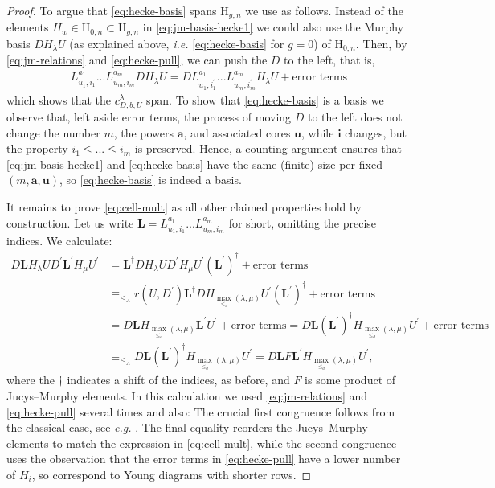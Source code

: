\documentclass[a4paper,11pt]{amsart}
\newcommand{\ie}{\textsl{i.e.}}
\newcommand{\eg}{\textsl{e.g.}}
\renewcommand{\dots}{\text{...}}
\newcommand{\setstuff}[1]{\mathrm{#1}}
\newcommand{\bsym}[1]{\boldsymbol{#1}}
\newcommand{\jm}{L}
\numberwithin{equation}{section}
\begin{document}
\begin{proof}
To argue that \eqref{eq:hecke-basis} spans
$\setstuff{H}_{g,n}$ we use \cite[Proposition 3.16]{Ma-hecke-schur} as follows.
Instead of the elements $H_{w}\in\setstuff{H}_{0,n}\subset
\setstuff{H}_{g,n}$ in \eqref{eq:jm-basis-hecke1} we could 
also use the Murphy basis $DH_{\lambda}U$ (as explained above, {\ie} 
\eqref{eq:hecke-basis} for $g=0$) of $\setstuff{H}_{0,n}$. Then, by 
\eqref{eq:jm-relations} and \eqref{eq:hecke-pull}, we can push 
the $D$ to the left, that is, 
\begin{gather*}
\jm_{u_{1}^{},i_{1}}^{a_{1}}\dots 
\jm_{u_{m},i_{m}}^{a_{m}}DH_{\lambda}U
=D\jm_{u_{1},i_{1}^{\prime}}^{a_{1}}\dots 
\jm_{u_{m},i_{m}^{\prime}}^{a_{m}}H_{\lambda}U+\text{error terms}
\end{gather*} 
which shows that the $c_{D,b,U}^{\lambda}$ span.
To show that \eqref{eq:hecke-basis} is a basis we observe that,
left aside error terms, the process of moving $D$ to the left 
does not change the number $m$, 
the powers $\bsym{a}$, and associated cores $\bsym{u}$, while 
$\bsym{i}$ changes, but the property 
$i_{1}\leq\dots\leq i_{m}$ is preserved. Hence, 
a counting argument ensures that \eqref{eq:jm-basis-hecke1} and 
\eqref{eq:hecke-basis} have the same (finite) size per fixed 
$(m,\bsym{a},\bsym{u})$, 
so \eqref{eq:hecke-basis} is indeed a basis.

It remains to prove \eqref{eq:cell-mult} as all other claimed 
properties hold by construction. Let us write 
$\bsym{L}=\jm_{u_{1},i_{1}}^{a_{1}}\dots 
\jm_{u_{m},i_{m}}^{a_{m}}$ for short, omitting the precise indices.
We calculate: 
\begin{align*}
D\bsym{L}H_{\lambda}U
D^{\prime}\bsym{L}^{\prime}H_{\mu}U^{\prime}
&=
\bsym{L}^{\dagger}DH_{\lambda}U
D^{\prime}H_{\mu}U^{\prime}(\bsym{L}^{\prime})^{\dagger}
+\text{error terms}
\\
&\equiv_{\leq_{\Lambda}}
r(U,D^{\prime})
\bsym{L}^{\dagger}DH_{\max_{\leq_{d}}(\lambda,\mu)}
U^{\prime}(\bsym{L}^{\prime})^{\dagger}
+\text{error terms}
\\
&=
D\bsym{L}H_{\max_{\leq_{d}}(\lambda,\mu)}
\bsym{L}^{\prime}U^{\prime}
+\text{error terms}
=
D\bsym{L}
(\bsym{L}^{\prime})^{\dagger}H_{\max_{\leq_{d}}(\lambda,\mu)}U^{\prime}
+\text{error terms}
\\
&\equiv_{\leq_{\Lambda}}
D\bsym{L}
(\bsym{L}^{\prime})^{\dagger}H_{\max_{\leq_{d}}(\lambda,\mu)}U^{\prime}
=
D\bsym{L}
F\bsym{L}^{\prime}H_{\max_{\leq_{d}}(\lambda,\mu)}U^{\prime}
,
\end{align*}
where the $\dagger$ indicates
a shift of the indices, as before, and $F$ 
is some product of Jucys--Murphy elements. 
In this calculation we used 
\eqref{eq:jm-relations} 
and \eqref{eq:hecke-pull} several times and also:
The crucial first congruence 
follows from the classical case, see {\eg} \cite[Theorem 3.20]{Ma-hecke-schur}.
The final equality reorders the 
Jucys--Murphy elements to match the expression in 
\eqref{eq:cell-mult}, while the second congruence uses 
the observation that the error terms in \eqref{eq:hecke-pull} 
have a lower number of $H_{i}$, so correspond to Young diagrams with shorter rows.
\end{proof} 
\end{document}
